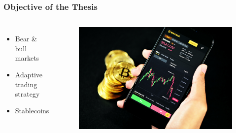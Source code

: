 \begin{frame}
  \frametitle{Objective of the Thesis}
  \begin{columns}
    \begin{itemize}
        \item Bear \& bull markets
        \item Adaptive trading strategy
        \item Stablecoins
    \end{itemize}


    \begin{figure}
        \includegraphics[width=\textwidth]{img/bitcoin.jpg}
    \end{figure}
  \end{columns}
\end{frame}






